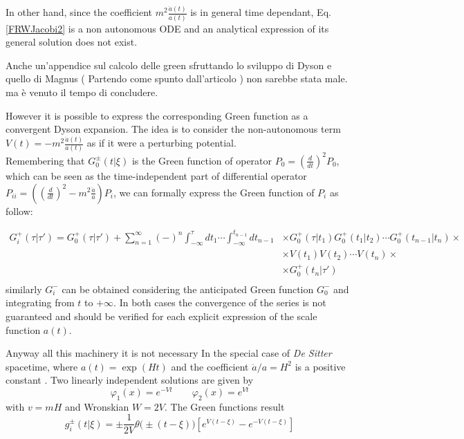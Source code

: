 \documentclass[Main]{subfiles}
\begin{document}
			In other hand, since the coefficient $m^2 \frac{\ddot{a}(t)}{a(t)}$ is in general time dependant,  Eq. \ref{FRWJacobi2} is a non autonomous ODE and an analytical expression of its general solution does not exist.
\ifToninus
	\begin{Warning}	
		Anche un'appendice sul calcolo delle green sfruttando lo sviluppo di Dyson e quello di Magnus ( Partendo come spunto dall'articolo \cite{Dappiaggi2014}) non sarebbe stata male. ma è venuto il tempo di concludere.
	\end{Warning}
\fi	
			However it is possible to express the corresponding Green function as a convergent Dyson expansion\cite{Dappiaggi2014}.
			The idea is to consider the non-autonomous term $V(t) = -m^2 \frac{\ddot{a}(t)}{a(t)}$ as if it were a perturbing potential.\\
			Remembering that $G^\pm_0 (t \vert \xi)$ is the Green function of operator \ifToninus$P_{0}=\left(\frac{d}{dt}\right)^2$\else$P_0$\fi, which can be seen as the time-independent part of differential operator \ifToninus$P_{i i}=\left( \left(\frac{d}{dt}\right)^2 - m^2 \frac{\ddot{a}}{a} \right)$\else$P_i$\fi, we can formally express the Green function of $P_{i}$ as follow:
			
			\begin{align*}
				G^+_i ( \tau \vert \tau' ) = G^+_0( \tau \vert \tau' ) + \sum_{n=1}^\infty (-)^n 
				\int_{-\infty}^\tau dt_1 \cdots \int_{-\infty}^{t_{n-1}} dt_{n-1} 
				& \times	  G^+_0(\tau \vert t_1) G^+_0(t_1\vert t_2) \cdots G^+_0(t_{n-1} \vert t_n) \times \\
				& \times  V(t_1) V(t_2) \cdots V(t_n) \times \\
				& \times  G^+_0 (t_n \vert \tau' ) \\
			\end{align*}		
			similarly $G^-_i$  can be obtained considering the anticipated Green function $G^-_0$ and integrating from $t$ to $+\infty$.
			In both cases the convergence of the series is not guaranteed and should be verified for each explicit expression of the scale function $a (t)$.
			
			\vspace{2mm}
			\ifToninus Anyway all this machinery it is not necessary \fi In the special case of \emph{De Sitter} spacetime, where $ a(t) = \exp(H t)$ and the coefficient $\ddot{a}/a=H^2$ is a positive constant  \cite{Wald1984}.
			Two linearly independent solutions are given by
			\begin{displaymath}
				\varphi_1(x) = e^{-V t} \qquad \varphi_2(x)= e^{Vt}
			\end{displaymath}
			with $v=m H$ and Wronskian $W= 2V$.
			The Green functions result
			\begin{displaymath}
								g^\pm_i(t \vert \xi) = \pm \frac{1}{2V}\theta\big(\pm(t-\xi)\big) \left[ e^{V(t-\xi)} - e^{-V(t-\xi)}\right]
			\end{displaymath}
\end{document}
